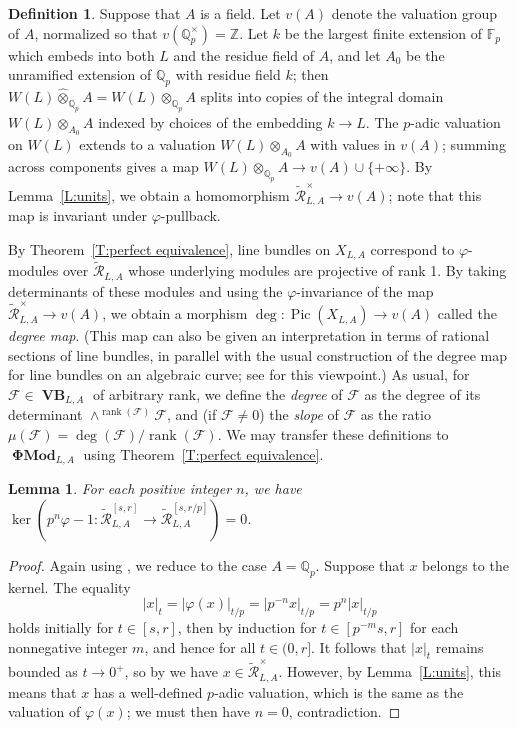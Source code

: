 \documentclass[12pt]{amsart}
\newtheorem{lemma}[theorem]{Lemma}
\theoremstyle{definition}
\newtheorem{defn}[theorem]{Definition}
\numberwithin{equation}{theorem}
\newcommand{\QQ}{\mathbb{Q}}
\newcommand{\ZZ}{\mathbb{Z}}
\newcommand{\calF}{\mathcal{F}}
\newcommand{\calR}{\mathcal{R}}
\DeclareMathOperator{\PhiMod}{\mathbf{\Phi Mod}}
\DeclareMathOperator{\Pic}{Pic}
\DeclareMathOperator{\rank}{rank}
\DeclareMathOperator{\VB}{\mathbf{VB}}
\begin{document}
\begin{defn}
Suppose that $A$ is a field. Let $v(A)$ denote the valuation group of $A$, normalized so that $v(\QQ_p^\times) = \ZZ$. 
Let $k$ be the largest finite extension of $\mathbb{F}_p$ which embeds into both $L$ and the residue field of $A$, and let $A_0$ be the unramified extension of $\QQ_p$ with residue field $k$; then $W(L) \widehat{\otimes}_{\QQ_p} A = W(L) \otimes_{\QQ_p} A$ splits into copies of the integral domain $W(L) \otimes_{A_0} A$ indexed by choices of the embedding $k \to L$.
The $p$-adic valuation on $W(L)$ extends to a valuation
$W(L) \otimes_{A_0} A$ with values in $v(A)$; summing across components gives a map
$W(L) \otimes_{\QQ_p} A \to v(A) \cup \{+\infty\}$.
By Lemma~\ref{L:units},
we obtain a homomorphism $\tilde{\calR}_{L,A}^{\times} \to v(A)$; note that this map is invariant under $\varphi$-pullback.

By Theorem~\ref{T:perfect equivalence}, line bundles on $X_{L,A}$ correspond to $\varphi$-modules over $\tilde{\calR}_{L,A}$ whose underlying modules are projective of rank 1.
By taking determinants of these modules and using the $\varphi$-invariance of the map 
$\tilde{\calR}_{L,A}^{\times} \to v(A)$, we obtain a morphism $\deg: \Pic(X_{L,A}) \to v(A)$ called the \emph{degree map}.
(This map can also be given an interpretation in terms of rational sections of line bundles, in parallel with the usual construction of the degree map for line bundles on an algebraic curve; see \cite{fargues-fontaine} for this viewpoint.)
As usual, for $\calF \in \VB_{L,A}$ of arbitrary rank, we define the \emph{degree} of $\calF$ as the degree of its determinant $\wedge^{\rank(\calF)} \calF$, and (if $\calF \neq 0$) the \emph{slope} of $\calF$ as the ratio $\mu(\calF) = \deg(\calF)/\rank(\calF)$.
We may transfer these definitions to $\PhiMod_{L,A}$ using Theorem~\ref{T:perfect equivalence}.
\end{defn}

\begin{lemma} \label{L:no subinvariants}
For each positive integer $n$, we have
$\ker(p^n \varphi-1: \tilde{\calR}^{[s,r]}_{L,A} \to \tilde{\calR}^{[s,r/p]}_{L,A}) = 0$. \end{lemma}
\begin{proof}
Again using \cite[Lemma~2.2.9(b)]{kedlaya-liu1}, we reduce to the case $A = \QQ_p$.
Suppose that $x$ belongs to the kernel. The equality
\[
\left| x \right|_{t} = \left| \varphi(x) \right|_{t/p} = \left| p^{-n} x \right|_{t/p} 
= p^n \left| x \right|_{t/p}
\]
holds initially for $t \in [s, r]$, then by induction for 
$t \in [p^{-m} s, r]$ for each nonnegative integer $m$,
and hence for
all $t \in (0, r]$.
It follows that $\left| x \right|_t$ remains bounded as $t \to 0^+$, so by 
\cite[Lemma~4.2.4]{kedlaya-liu1} we have $x \in \tilde{\calR}_{L,A}^{\times}$.
However, by Lemma~\ref{L:units}, this means that $x$ has a well-defined $p$-adic valuation, which is the same as the valuation of $\varphi(x)$; we must then have $n=0$, contradiction.
\end{proof}
\end{document}
